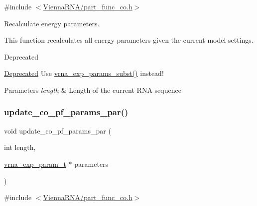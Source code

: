 {\ttfamily \#include $<$\hyperlink{part__func__co_8h}{Vienna\+R\+N\+A/part\+\_\+func\+\_\+co.\+h}$>$}



Recalculate energy parameters. 

This function recalculates all energy parameters given the current model settings.

\begin{DoxyRefDesc}{Deprecated}
\item[\hyperlink{deprecated__deprecated000117}{Deprecated}]Use \hyperlink{group__energy__parameters_ga8e7ac4fab3b0cc03afbc134eaafb3525}{vrna\+\_\+exp\+\_\+params\+\_\+subst()} instead!\end{DoxyRefDesc}



\begin{DoxyParams}{Parameters}
{\em length} & Length of the current R\+NA sequence \\
\hline
\end{DoxyParams}
\mbox{\label{group__part__func__global__deprecated_ga75465d7e8793db68a434d83df9a2e794}} 
\subsubsection{\texorpdfstring{update\+\_\+co\+\_\+pf\+\_\+params\+\_\+par()}{update\_co\_pf\_params\_par()}}
{\footnotesize\ttfamily void update\+\_\+co\+\_\+pf\+\_\+params\+\_\+par (\begin{DoxyParamCaption}\item[{int}]{length,  }\item[{\hyperlink{group__energy__parameters_ga01d8b92fe734df8d79a6169482c7d8d8}{vrna\+\_\+exp\+\_\+param\+\_\+t} $\ast$}]{parameters }\end{DoxyParamCaption})}



{\ttfamily \#include $<$\hyperlink{part__func__co_8h}{Vienna\+R\+N\+A/part\+\_\+func\+\_\+co.\+h}$>$}



